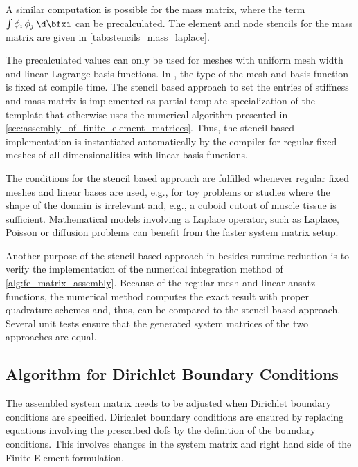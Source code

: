 A similar computation is possible for the mass matrix, where the term $\int \phi_i\,\phi_j \,\d\bfxi$ can be precalculated. The element and node stencils for the mass matrix are given in \cref{tab:stencils_mass_laplace}.

The precalculated values can only be used for meshes with uniform mesh width and linear Lagrange basis functions. In \opendihu{}, the type of the mesh and basis function is fixed at compile time. The stencil based approach to set the entries of stiffness and mass matrix is implemented as partial template specialization of the template that otherwise uses the numerical algorithm presented in \cref{sec:assembly_of_finite_element_matrices}. Thus, the stencil based implementation is instantiated automatically by the compiler for regular fixed meshes of all dimensionalities with linear basis functions. 

The conditions for the stencil based approach are fulfilled whenever regular fixed meshes and linear bases are used, e.g., for toy problems or studies where the shape of the domain is irrelevant and, e.g., a cuboid cutout of muscle tissue is sufficient. Mathematical models involving a Laplace operator, such as Laplace, Poisson or diffusion problems can benefit from the faster system matrix setup.

Another purpose of the stencil based approach in \opendihu{} besides runtime reduction is to verify the implementation of the numerical integration method of \cref{alg:fe_matrix_assembly}. Because of the regular mesh and linear ansatz functions, the numerical method computes the exact result with proper quadrature schemes and, thus, can be compared to the stencil based approach. Several unit tests ensure that the generated system matrices of the two approaches are equal.


\subsection{Algorithm for Dirichlet Boundary Conditions}

The assembled system matrix needs to be adjusted when Dirichlet boundary conditions are specified.
Dirichlet boundary conditions are ensured by replacing equations involving the prescribed dofs by the definition of the boundary conditions. This involves changes in the system matrix and right hand side of the Finite Element formulation.

